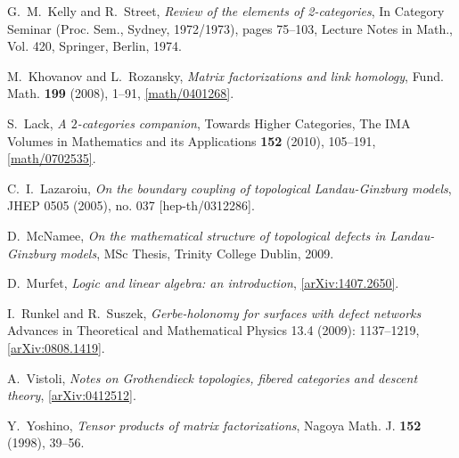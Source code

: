 \documentclass[english,letter paper,12pt,leqno]{article}
\theoremstyle{example}
\numberwithin{equation}{section}
\begin{document}
\begin{thebibliography}{BHLS03}
G.~M.~Kelly and R.~Street, \textsl{Review of the elements of 2-categories}, In Category Seminar (Proc. Sem., Sydney, 1972/1973), pages 75--103, Lecture Notes in Math., Vol. 420, Springer, Berlin, 1974.

M.~Khovanov and L.~Rozansky, \textsl{Matrix factorizations and link homology}, Fund. Math.
  \textbf{199} (2008), 1--91,
  \href{http://arxiv.org/abs/math/0401268}{[math/0401268]}.
  
S.~Lack, \textsl{A $2$-categories companion}, 
Towards Higher Categories, 
The IMA Volumes in Mathematics and its Applications \textbf{152} (2010), 105--191, 
\href{http://arxiv.org/abs/math/0702535}{[math/0702535]}.

C.~I.~Lazaroiu, \textsl{On the boundary coupling of topological {L}andau-{G}inzburg models}, JHEP 0505 (2005), no. 037 [hep-th/0312286].
  
D.~McNamee, \textsl{On the mathematical structure of topological defects in
  {L}andau-{G}inzburg models}, MSc Thesis, Trinity College Dublin, 2009.
  

D.~Murfet, \textsl{Logic and linear algebra: an introduction}, \href{http://arxiv.org/abs/1407.2650}{[arXiv:1407.2650]}.


I.~Runkel and R.~Suszek, \textsl{Gerbe-holonomy for surfaces with defect networks} Advances in Theoretical and Mathematical Physics 13.4 (2009): 1137--1219, \href{http://arxiv.org/abs/0808.1419}{[arXiv:0808.1419]}.

A.~Vistoli, \textsl{Notes on {G}rothendieck topologies, fibered categories and descent theory}, \href{http://arxiv.org/abs/math/0412512}{[arXiv:0412512]}.

Y.~Yoshino, \textsl{Tensor products of matrix factorizations}, Nagoya Math. J.
  \textbf{152} (1998), 39--56.
  
\end{thebibliography}
\end{document}
